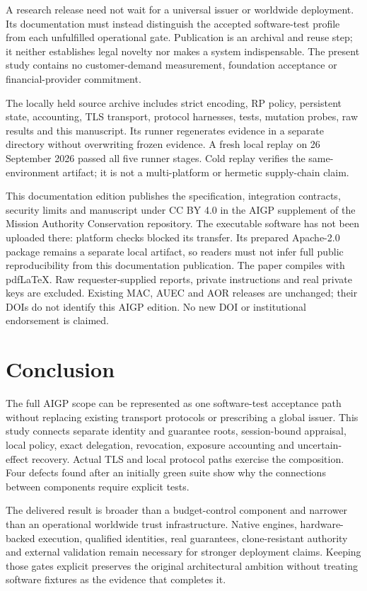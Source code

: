 \documentclass[journal,10pt]{IEEEtran}
\begin{document}
A research release need not wait for a universal issuer or worldwide deployment. Its documentation must instead distinguish the accepted software-test profile from each unfulfilled operational gate. Publication is an archival and reuse step; it neither establishes legal novelty nor makes a system indispensable. The present study contains no customer-demand measurement, foundation acceptance or financial-provider commitment.

The locally held source archive includes strict encoding, RP policy, persistent state, accounting, TLS transport, protocol harnesses, tests, mutation probes, raw results and this manuscript. Its runner regenerates evidence in a separate directory without overwriting frozen evidence. A fresh local replay on 26 September 2026 passed all five runner stages. Cold replay verifies the same-environment artifact; it is not a multi-platform or hermetic supply-chain claim.

This documentation edition publishes the specification, integration contracts, security limits and manuscript under CC BY 4.0 in the AIGP supplement of the Mission Authority Conservation repository. The executable software has not been uploaded there: platform checks blocked its transfer. Its prepared Apache-2.0 package remains a separate local artifact, so readers must not infer full public reproducibility from this documentation publication. The paper compiles with pdfLaTeX. Raw requester-supplied reports, private instructions and real private keys are excluded. Existing MAC, AUEC and AOR releases are unchanged; their DOIs do not identify this AIGP edition. No new DOI or institutional endorsement is claimed.

\section{Conclusion}
The full AIGP scope can be represented as one software-test acceptance path without replacing existing transport protocols or prescribing a global issuer. This study connects separate identity and guarantee roots, session-bound appraisal, local policy, exact delegation, revocation, exposure accounting and uncertain-effect recovery. Actual TLS and local protocol paths exercise the composition. Four defects found after an initially green suite show why the connections between components require explicit tests.

The delivered result is broader than a budget-control component and narrower than an operational worldwide trust infrastructure. Native engines, hardware-backed execution, qualified identities, real guarantees, clone-resistant authority and external validation remain necessary for stronger deployment claims. Keeping those gates explicit preserves the original architectural ambition without treating software fixtures as the evidence that completes it.
\end{document}
